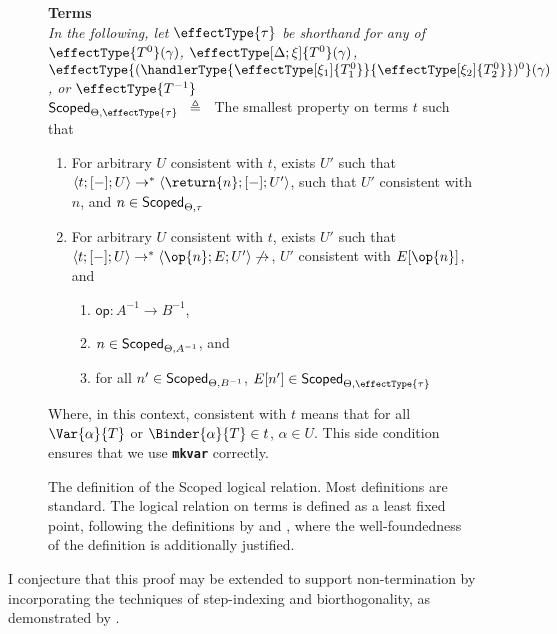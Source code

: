 \begin{figure}
\begin{source-desc}
\textbf{Terms}\\
{\scriptsize{\textit{In the following, let $\effectType{\tau}$ be shorthand for any of $\effectType{T^{0}} (\gamma)$, $\effectType[\Delta; \xi]{T^{0}} (\gamma)$, $\effectType{(\handlerType{\effectType[\xi_1]{T_1^0}}{\effectType[\xi_2]{T_2^0}})^{0}} (\gamma)$, or $\effectType{T^{-1}}$}}}\\

$\scoped{\effectType{\tau}} \hspace{2mm} \triangleq \hspace{2mm}$ The smallest property on terms $t$ such that 
\begin{enumerate}
  \item For arbitrary $U$ consistent with $t$, exists $U'$ such that $\langle t;[-];U \rangle \to^{*} \langle \return{n}; [-]; U' \rangle$, such that $U'$ consistent with $n$, and $n \in \textsf{Scoped}_{{\Theta}, {\tau}}$ 
  \item For arbitrary $U$ consistent with $t$, exists $U'$ such that $\langle t;[-];U \rangle \to^{*} \langle \op{n}; E; U' \rangle \not\to$, $U'$ consistent with $E[\op{n}]$, and 
  \begin{enumerate}
    \item $\textsf{op}: A^{-1} \to B^{-1}$,
    \item $n \in \textsf{Scoped}_{{\Theta}, {A^{-1}}}$, and 
    \item for all $n' \in \textsf{Scoped}_{{\Theta}, {B^{-1}}}$, $E[n'] \in \scoped{\effectType{\tau}}$
  \end{enumerate}
\end{enumerate}
Where, in this context, consistent with $t$ means that for all $\Var{\alpha}{T}$ or $\Binder{\alpha}{T} \in t$, $\alpha \in U$. This side condition ensures that we use \textbf{\texttt{mkvar}} correctly.
\end{source-desc}
\caption{The definition of the \textsf{Scoped} logical relation. Most definitions are standard. The logical relation on terms is defined as a least fixed point, following the definitions by \citet{plotkin-2025} and \citet{kuchta-2023}, where the well-foundedness of the definition is additionally justified.}
\label{fig:logical-relation-defn}
\end{figure}

I conjecture that this proof may be extended to support non-termination by incorporating the techniques of step-indexing and biorthogonality, as demonstrated by \citet{biernacki-2017}.


